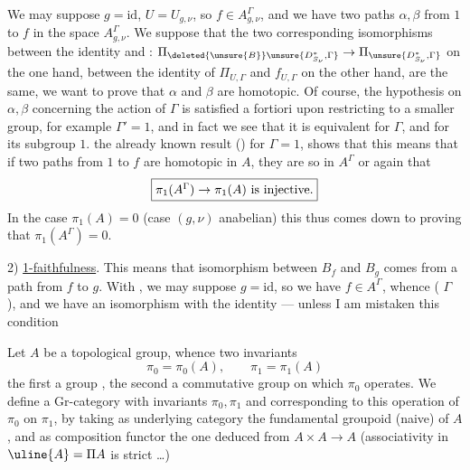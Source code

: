 We may suppose \(g=\mathrm{id}\), \(U=U_{g,\nu}\), so \(f\in A_{g,\nu}^{\Gamma}\), and we have two paths \(\alpha,\beta\) from \(1\) to  \(f\) in the space \(A_{g,\nu}^{\Gamma}\). We suppose that the two corresponding isomorphisms between the identity  and  : \(\Pi_{\deleted{\unsure{B}}\unsure{D^*_{S_\nu},\Gamma}}\to\Pi_{\unsure{D^*_{S_\nu},\Gamma}}\) on the one hand, between the identity of \(\Pi_{U,\Gamma}\) and \(f_{U,\Gamma}\) on the other hand, are the same, we want to prove that \(\alpha\) and \(\beta\) are homotopic. Of course, the hypothesis  on \(\alpha,\beta\) concerning the action of \(\Gamma\) is satisfied a fortiori upon restricting to a smaller group, for example \deleted{\unsure{\(\Gamma\)}} \(\Gamma'=1\), and in fact we see that it is equivalent for \(\Gamma\), and for its subgroup \(1\).  the already known result () for \(\Gamma=1\), shows that this means that if two paths  from \(1\) to \(f\) are homotopic in \(A\), they are so in \(A^{\Gamma}\) or again that
\[
\fbox{\(\pi_1(A^{\Gamma})\to\pi_1(A)\ \mbox{is injective.}\)}
\]
In the case \(\pi_1(A)=0\) (case \((g,\nu)\) anabelian) this thus comes down to proving that \(\pi_1(A^{\Gamma})=0\).



2) \uline{1-faithfulness}. This means  that \unsure{\(\forall\)} isomorphism between  \(B_f\) and \(B_g\) comes from a  path from \(f\) to \(g\). With , we may suppose \(g=\mathrm{id}\), so we have \(f\in A^{\Gamma}\), whence  (  \(\Gamma\) ), and we have an isomorphism with the identity --- unless I am mistaken this condition



Let \(A\) be a topological group, whence two invariants
\[
\pi_0=\pi_0(A),\qquad \pi_1=\pi_1(A)
\]
the first a group ,  the second a commutative group on which \(\pi_0\) operates. We define a Gr-category  with invariants \(\pi_0,\pi_1\) and corresponding to this operation of \(\pi_0\) on \(\pi_1\), by taking as underlying category the  fundamental  groupoid (naive) of \(A\), and as composition functor the one deduced from \(A\times A\to A\) (associativity in \(\uline{A}=\Pi A\) is strict \ldots)

